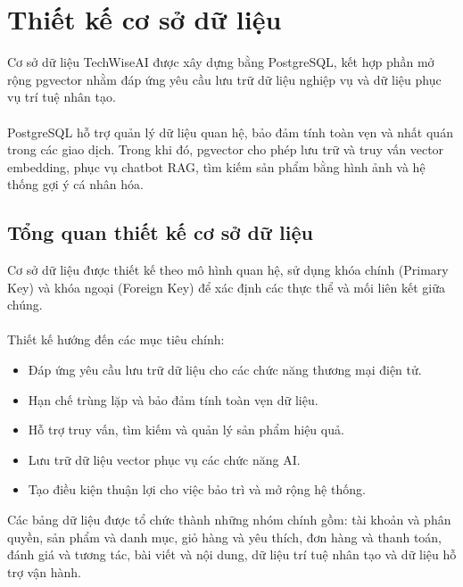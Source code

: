 \documentclass{report}
\begin{document}
\section{Thiết kế cơ sở dữ liệu}
Cơ sở dữ liệu TechWiseAI được xây dựng bằng PostgreSQL, kết hợp phần mở rộng pgvector nhằm đáp ứng yêu cầu lưu trữ dữ liệu nghiệp vụ và dữ liệu phục vụ trí tuệ nhân tạo.\\\\
PostgreSQL hỗ trợ quản lý dữ liệu quan hệ, bảo đảm tính toàn vẹn và nhất quán trong các giao dịch. Trong khi đó, pgvector cho phép lưu trữ và truy vấn vector embedding, phục vụ chatbot RAG, tìm kiếm sản phẩm bằng hình ảnh và hệ thống gợi ý cá nhân hóa.

\subsection{Tổng quan thiết kế cơ sở dữ liệu}
Cơ sở dữ liệu được thiết kế theo mô hình quan hệ, sử dụng khóa chính (Primary Key) và khóa ngoại (Foreign Key) để xác định các thực thể và mối liên kết giữa chúng.\\\\
Thiết kế hướng đến các mục tiêu chính:
\begin{itemize}
    \item Đáp ứng yêu cầu lưu trữ dữ liệu cho các chức năng thương mại điện tử.
    \item Hạn chế trùng lặp và bảo đảm tính toàn vẹn dữ liệu.
    \item Hỗ trợ truy vấn, tìm kiếm và quản lý sản phẩm hiệu quả.
    \item Lưu trữ dữ liệu vector phục vụ các chức năng AI.
    \item Tạo điều kiện thuận lợi cho việc bảo trì và mở rộng hệ thống.
\end{itemize}
Các bảng dữ liệu được tổ chức thành những nhóm chính gồm: tài khoản và phân quyền, sản phẩm và danh mục, giỏ hàng và yêu thích, đơn hàng và thanh toán, đánh giá và tương tác, bài viết và nội dung, dữ liệu trí tuệ nhân tạo và dữ liệu hỗ trợ vận hành.
\end{document}
